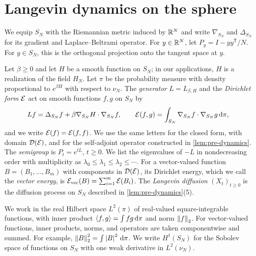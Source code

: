 \section{Langevin dynamics on the sphere}\label{sec:pre-dynamics}

We equip $S_N$ with the Riemannian metric induced by $\mathbb R^N$ and write $\nabla_{S_N}$ and $\Delta_{S_N}$ for its gradient and Laplace--Beltrami operator. For $y\in\mathbb R^N$, let $P_y=I-yy^{\mathsf T}/N$. For $y\in S_N$, this is the orthogonal projection onto the tangent space at $y$.

\begin{definition}\label{def:pre-dynamics}
Let $\beta\ge0$ and let $H$ be a smooth function on $S_N$; in our applications, $H$ is a realization of the field $H_N$. Let $\pi$ be the probability measure with density proportional to $e^{\beta H}$ with respect to $\nu_N$. The \emph{generator} $L=L_{\beta,H}$ and the \emph{Dirichlet form} $\mathcal E$ act on smooth functions $f,g$ on $S_N$ by
\[
Lf=\Delta_{S_N}f+\beta\nabla_{S_N}H\cdot\nabla_{S_N}f,\qquad \mathcal E(f,g)=\int_{S_N}\nabla_{S_N}f\cdot\nabla_{S_N}g\,\mathrm d\pi,
\]
and we write $\mathcal E(f)=\mathcal E(f,f)$. We use the same letters for the closed form, with domain $\mathcal D(\mathcal E)$, and for the self-adjoint operator constructed in \cref{lem:pre-dynamics}. The \emph{semigroup} is $P_t=e^{tL}$, $t\ge0$. We list the eigenvalues of $-L$ in nondecreasing order with multiplicity as $\lambda_0\le\lambda_1\le\lambda_2\le\cdots$. For a vector-valued function $B=(B_1,\dots,B_m)$ with components in $\mathcal D(\mathcal E)$, its Dirichlet energy, which we call the \emph{vector energy}, is $\mathcal E_{\rm vec}(B)=\sum_{i=1}^m\mathcal E(B_i)$. The \emph{Langevin diffusion} $(X_t)_{t\ge0}$ is the diffusion process on $S_N$ described in \cref{lem:pre-dynamics}(5).
\end{definition}

We work in the real Hilbert space $L^2(\pi)$ of real-valued square-integrable functions, with inner product $\langle f,g\rangle=\int fg\,\mathrm d\pi$ and norm $\left\lVert f\right\rVert_2$. For vector-valued functions, inner products, norms, and operators are taken componentwise and summed. For example, $\left\lVert B\right\rVert_2^2=\int\left|B\right|^2\,\mathrm d\pi$. We write $H^1(S_N)$ for the Sobolev space of functions on $S_N$ with one weak derivative in $L^2(\nu_N)$.

